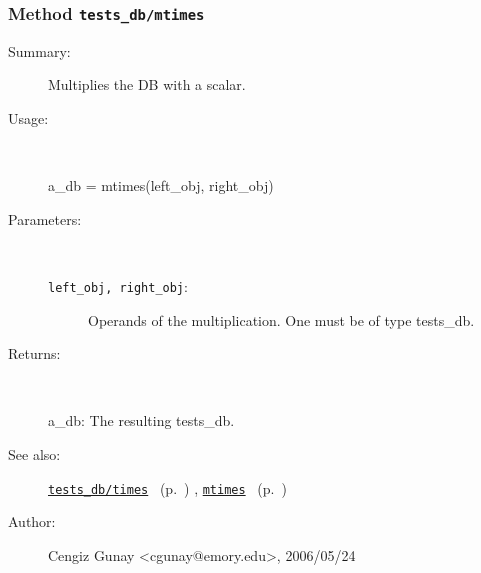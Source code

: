 \subsubsection[Method \texttt{mtimes}]{Method \texttt{tests\_db/mtimes}}%
%
\label{ref_tests_db__mtimes}%
\hypertarget{ref_tests_db__mtimes}{}%
\begin{description}
\item[Summary:]Multiplies the DB with a scalar.
%
\item[Usage:]~%
\begin{lyxcode}%
a\_db = mtimes(left\_obj, right\_obj)
%
\end{lyxcode}%
%
%
\item[Parameters:]~
\begin{description}%
\item[\texttt{left\_obj, right\_obj}:]
 Operands of the multiplication. One must be of type tests\_db.
\end{description}%
%
\item[Returns:]~

	a\_db: The resulting tests\_db.
%
%
\item[See also:]%
\hyperlink{ref_tests_db__times}{\texttt{tests\_db/times}}%
\ (p.~\pageref{ref_tests_db__times})%
%
, \hyperlink{ref_mtimes}{\texttt{mtimes}}%
\ (p.~\pageref{ref_mtimes})%
%
%
\item[Author:]%
Cengiz Gunay <cgunay@emory.edu>, 2006/05/24%
\end{description}
\methodline%
